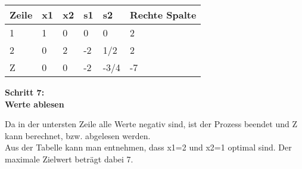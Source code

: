 \begin{table}[!h]
\begin{tabular}{|l|l|l|l|l|l|}
\hline
\rowcolor[HTML]{C0C0C0} 
Zeile                     & x1 & x2 & s1 & s2   & Rechte Spalte \\ \hline
\rowcolor[HTML]{FFFFFF} 
\cellcolor[HTML]{C0C0C0}1 & 1  & 0  & 0  & 0    & 2             \\ \hline
\rowcolor[HTML]{FFFFFF} 
\cellcolor[HTML]{C0C0C0}2 & 0  & 2  & -2 & 1/2  & 2             \\ \hline
\rowcolor[HTML]{FFFFFF} 
\cellcolor[HTML]{C0C0C0}Z & 0  & 0  & -2 & -3/4 & -7            \\ \hline
\end{tabular}
\end{table}
\begin{center}\textbf{Schritt 7: \\Werte ablesen }\\\end{center}
Da in der untersten Zeile alle Werte negativ sind, ist der Prozess beendet und Z kann berechnet, bzw. abgelesen werden.\\
Aus der Tabelle kann man entnehmen, dass x1=2 und x2=1 optimal sind. Der maximale Zielwert beträgt dabei 7. 
